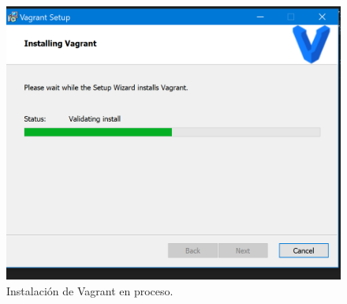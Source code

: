 \documentclass[letterpaper, 12pt, oneside]{article}
\begin{document}
\begin{center}
        \begin{figure}[H]
        \includegraphics[scale=0.9]{img/install/vagrant5.png}
        \caption{Instalación de Vagrant en proceso.}
        \label{fig:va5}
    \end{figure}
    \end{center}
   
\end{document}
